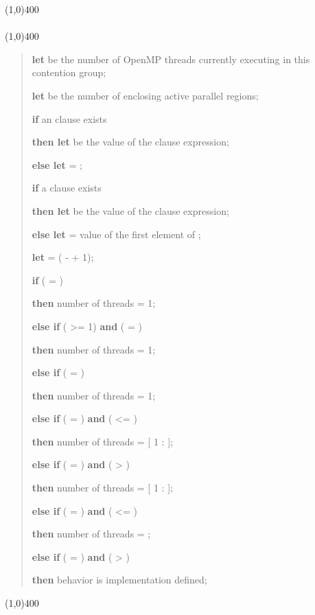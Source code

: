 \begin{samepage}
\nolinenumbers\line(1,0){400}\\[.4\baselineskip]
\\[-0.5\baselineskip]
\line(1,0){400}\linenumbers

\begin{quote}
\textbf{let}  be the number of OpenMP threads currently executing in 
this contention group;

\textbf{let}  be the number of enclosing active parallel regions;

\textbf{if} an  clause exists

\textbf{then let}  be the value of the  clause expression; 

\textbf{else let}  = ; 

\textbf{if} a  clause exists 

\textbf{then let}  be the value of the  clause 
expression; 

\textbf{else let}  = value of the first element of ; 

\textbf{let}  = ( -  + 1);

\textbf{if} ( = ) 

\textbf{then} number of threads = 1; 

\textbf{else if} ( >= 1) \textbf{and} ( = ) 

\textbf{then} number of threads = 1; 

\textbf{else if} ( = ) 

\textbf{then} number of threads = 1; 

\textbf{else if} ( = ) \textbf{and} ( <= )

\textbf{then} number of threads = [ 1 :  ];

\textbf{else if} ( = ) \textbf{and} ( > )

\textbf{then} number of threads = [ 1 :  ];

\textbf{else if} ( = ) \textbf{and} ( <= )

\textbf{then} number of threads = ;

\textbf{else if} ( = ) \textbf{and} ( > )

\textbf{then} behavior is implementation defined;
\end{quote}

\nolinenumbers\line(1,0){400}\linenumbers
\end{samepage}
\bigskip

